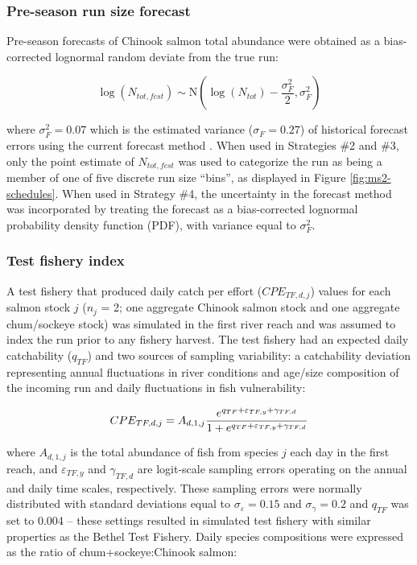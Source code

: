 \documentclass[12pt,]{book}
\theoremstyle{definition}
\theoremstyle{definition}
\theoremstyle{definition}
\theoremstyle{remark}
\begin{document}
\subsubsection{Pre-season run size forecast}\label{fcst}

\noindent
Pre-season forecasts of Chinook salmon total abundance were obtained as
a bias-corrected lognormal random deviate from the true run:

\begin{equation}
  \log\left(N_{tot,fcst}\right) \sim \text{N}(\log(N_{tot})-\frac{\sigma_F^2}{2}, \sigma_F^2)
  \label{eq:get-fcst}
\end{equation}

\noindent
where \(\sigma_F^2 = 0.07\) which is the estimated variance
(\(\sigma_F = 0.27\)) of historical forecast errors using the current
forecast method \citep[presented in][]{staton-catalano-2019}. When used
in Strategies \#2 and \#3, only the point estimate of \(N_{tot,fcst}\)
was used to categorize the run as being a member of one of five discrete
run size ``bins'', as displayed in Figure \ref{fig:ms2-schedules}. When
used in Strategy \#4, the uncertainty in the forecast method was
incorporated by treating the forecast as a bias-corrected lognormal
probability density function (PDF), with variance equal to
\(\sigma^2_F\).

\subsubsection{Test fishery index}\label{tf}

\noindent
A test fishery that produced daily catch per effort (\(CPE_{TF,d,j}\))
values for each salmon stock \(j\) (\(n_j\) = 2; one aggregate Chinook
salmon stock and one aggregate chum/sockeye stock) was simulated in the
first river reach and was assumed to index the run prior to any fishery
harvest. The test fishery had an expected daily catchability
(\(q_{TF}\)) and two sources of sampling variability: a catchability
deviation representing annual fluctuations in river conditions and
age/size composition of the incoming run \citep{flynn-hilborn-2004} and
daily fluctuations in fish vulnerability:

\begin{equation}
  CPE_{TF,d,j} = A_{d,1,j} \space \frac{e^{q_{TF} + \varepsilon_{TF,y} + \gamma_{TF,d}}}{1+e^{q_{TF} + \varepsilon_{TF,y} + \gamma_{TF,d}}}
  \label{eq:get-tf-cpe}
\end{equation}

\noindent
where \(A_{d,1,j}\) is the total abundance of fish from species \(j\)
each day in the first reach, and \(\varepsilon_{TF,y}\) and
\(\gamma_{TF,d}\) are logit-scale sampling errors operating on the
annual and daily time scales, respectively. These sampling errors were
normally distributed with standard deviations equal to
\(\sigma_{\varepsilon} = 0.15\) and \(\sigma_{\gamma} = 0.2\) and
\(q_{TF}\) was set to 0.004 -- these settings resulted in simulated test
fishery with similar properties as the Bethel Test Fishery. Daily
species compositions were expressed as the ratio of chum+sockeye:Chinook
salmon:
\end{document}
